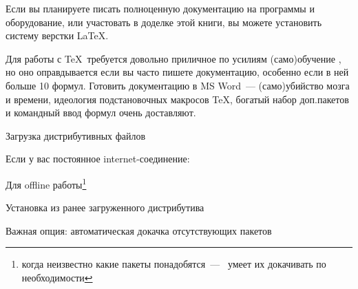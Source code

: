 \label{texinstall}

Если вы планируете писать полноценную документацию на программы
и оборудование, или участовать в доделке этой книги, вы можете установить
систему верстки \LaTeX.

Для работы с \TeX\ требуется довольно приличное по усилиям
(само)обучение \cite{lvovsky}, но оно оправдывается если вы часто 
пишете документацию, особенно если в ней больше 10 формул.
Готовить документацию в MS Word\ --- (само)убийство мозга и времени,
идеология подстановочных макросов \TeX, богатый набор доп.пакетов
и командный ввод формул очень доставляют.


\bigskip{}


\bigskip Загрузка дистрибутивных файлов



Если у вас постоянное internet-соединение: 

Для offline работы\footnote{когда неизвестно какие пакеты понадобятся\ ---
\miktex\ умеет их докачивать по необходимости} 



\bigskip Установка из ранее загруженного дистрибутива








Важная опция: автоматическая докачка отсутствующих пакетов

